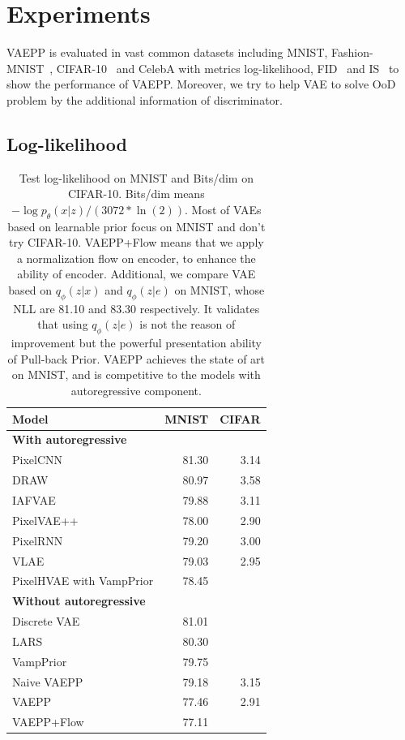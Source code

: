 \section{Experiments}
VAEPP is evaluated in vast common datasets including MNIST, Fashion-MNIST~\cite{xiao2017/online}, CIFAR-10~\cite{krizhevsky2009learning} and CelebA with metrics log-likelihood, FID~\cite{heusel2017gans} and IS~\cite{salimans2016improved} to show the performance of VAEPP. Moreover, we try to help VAE to solve OoD problem by the additional information of discriminator. 
\subsection{Log-likelihood}
\begin{table}[tb]
\centering
\begin{tabular}{lrr}  
\toprule
Model  &  MNIST & CIFAR\\
\midrule
\textbf{With autoregressive}   \\
PixelCNN         &  81.30  &  3.14   \\
DRAW             &  80.97  &  3.58    \\
IAFVAE           &  79.88  &  3.11    \\
PixelVAE++       &  78.00  &  2.90   \\
PixelRNN         &  79.20  &  3.00    \\
VLAE             &  79.03  &  2.95     \\
PixelHVAE with VampPrior &  78.45  &     \\
\midrule
\textbf{Without autoregressive}   \\
Discrete VAE     &  81.01     \\
LARS             &  80.30     \\
VampPrior        &  79.75     \\
Naive VAEPP      &  79.18 & 3.15    \\
VAEPP            &  77.46 & 2.91	     \\
VAEPP+Flow       &  77.11 &       \\
\bottomrule
\end{tabular}
\caption{Test log-likelihood on MNIST and Bits/dim on CIFAR-10. Bits/dim means $-\log p_\theta(x|z) / (3072 * \ln(2))$. Most of VAEs based on learnable prior focus on MNIST and don't try CIFAR-10. 
VAEPP+Flow means that we apply a normalization flow on encoder, to enhance the ability of encoder. 
Additional, we compare VAE based on $q_\phi(z|x)$ and $q_\phi(z|e)$ on MNIST, whose NLL are 81.10 and 83.30 respectively. It validates that using $q_\phi(z|e)$ is not the reason of improvement but the powerful presentation ability of Pull-back Prior. VAEPP achieves the state of art on MNIST, and is competitive to the models with autoregressive component. }
\label{tab:mnist-nll}
\end{table}
